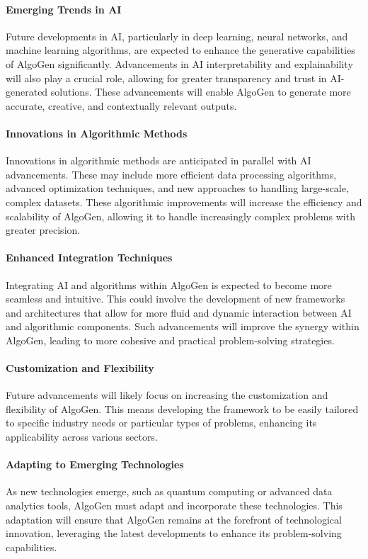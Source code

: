 \documentclass{article}
\begin{document}
\paragraph{Emerging Trends in AI}
Future developments in AI, particularly in deep learning, neural networks, and machine learning algorithms, are expected to enhance the generative capabilities of AlgoGen significantly. Advancements in AI interpretability and explainability will also play a crucial role, allowing for greater transparency and trust in AI-generated solutions. These advancements will enable AlgoGen to generate more accurate, creative, and contextually relevant outputs.

\paragraph{Innovations in Algorithmic Methods}
Innovations in algorithmic methods are anticipated in parallel with AI advancements. These may include more efficient data processing algorithms, advanced optimization techniques, and new approaches to handling large-scale, complex datasets. These algorithmic improvements will increase the efficiency and scalability of AlgoGen, allowing it to handle increasingly complex problems with greater precision.

\paragraph{Enhanced Integration Techniques}
Integrating AI and algorithms within AlgoGen is expected to become more seamless and intuitive. This could involve the development of new frameworks and architectures that allow for more fluid and dynamic interaction between AI and algorithmic components. Such advancements will improve the synergy within AlgoGen, leading to more cohesive and practical problem-solving strategies.

\paragraph{Customization and Flexibility}
Future advancements will likely focus on increasing the customization and flexibility of AlgoGen. This means developing the framework to be easily tailored to specific industry needs or particular types of problems, enhancing its applicability across various sectors.

\paragraph{Adapting to Emerging Technologies}
As new technologies emerge, such as quantum computing or advanced data analytics tools, AlgoGen must adapt and incorporate these technologies. This adaptation will ensure that AlgoGen remains at the forefront of technological innovation, leveraging the latest developments to enhance its problem-solving capabilities.
\end{document}

